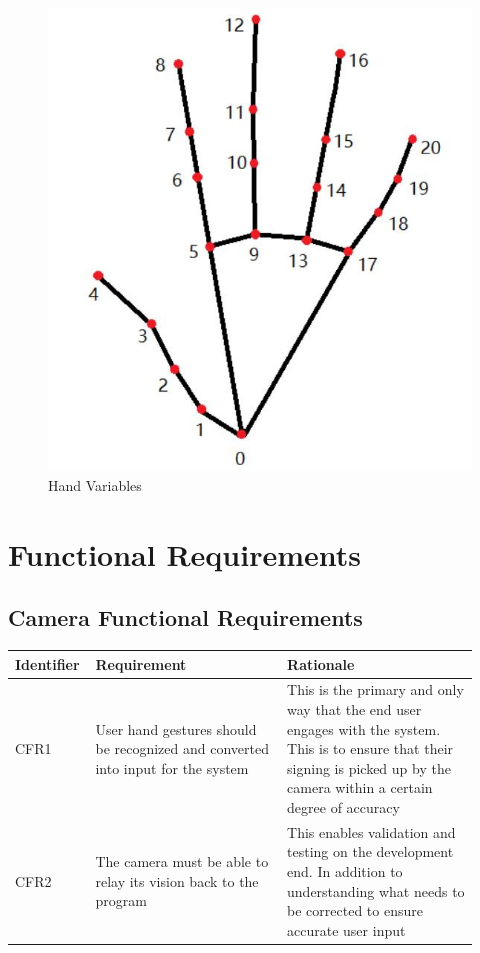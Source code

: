 \documentclass[12pt]{article}
\begin{document}
\begin{figure}[H] 
\centering
\includegraphics[width=\textwidth,height=0.88\textheight,keepaspectratio]{Hand.jpg} 
\caption{Hand Variables} 
\label{Fig.Monitor_Variables} 
\end{figure}

\section{Functional Requirements}
\subsection{Camera Functional Requirements}

\renewcommand{\arraystretch}{1.2}
\noindent \begin{tabularx}{\textwidth}{p{0.12\linewidth}|p{0.4\linewidth}|p{0.4\linewidth}}
\toprule
\textbf{Identifier} & \textbf{Requirement} & \textbf{Rationale}\\
\midrule
CFR1 
& User hand gestures should be recognized and converted into input for the system 
& This is the primary and only way that the end user engages with the system. This is to ensure that 
their signing is picked up by the camera within a certain degree of accuracy\\
\hline
CFR2
& The camera must be able to relay its vision back to the program
& This enables validation and testing on the development end. In addition to understanding what needs 
to be corrected to ensure accurate user input\\
\bottomrule
\end{tabularx}
\end{document}
